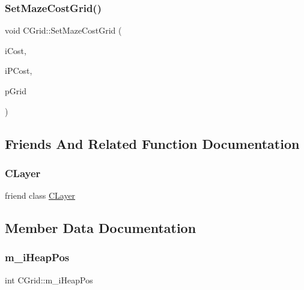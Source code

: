 \mbox{\label{classCGrid_aad3dff7adb72d18a6038718c1f02993a}} 
\subsubsection{\texorpdfstring{SetMazeCostGrid()}{SetMazeCostGrid()}\hspace{0.1cm}{\footnotesize\ttfamily [2/2]}}
{\footnotesize\ttfamily void C\+Grid\+::\+Set\+Maze\+Cost\+Grid (\begin{DoxyParamCaption}\item[{int}]{i\+Cost,  }\item[{int}]{i\+P\+Cost,  }\item[{\mbox{\hyperlink{classCGrid}{C\+Grid}} $\ast$}]{p\+Grid }\end{DoxyParamCaption})\hspace{0.3cm}{\ttfamily [inline]}}



\subsection{Friends And Related Function Documentation}
\mbox{\label{classCGrid_a7cc4d31573956cc6792fa6757cc49219}} 
\subsubsection{\texorpdfstring{CLayer}{CLayer}}
{\footnotesize\ttfamily friend class \mbox{\hyperlink{classCLayer}{C\+Layer}}\hspace{0.3cm}{\ttfamily [friend]}}



\subsection{Member Data Documentation}
\mbox{\label{classCGrid_a57166c24c1b0525e425a747636831c79}} 
\subsubsection{\texorpdfstring{m\_iHeapPos}{m\_iHeapPos}}
{\footnotesize\ttfamily int C\+Grid\+::m\+\_\+i\+Heap\+Pos}

